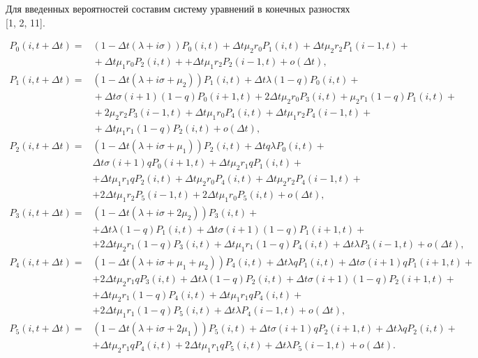 Для введенных вероятностей составим систему уравнений в конечных разностях [1, 2, 11]. 
\begin{adjustwidth}{0pt}{0pt}
	\begin{align*} 
		P_{0}(i,t+\Delta t)=&(1-\Delta t(\lambda+i\sigma))P_{0}(i,t)+\Delta t\mu_{2}r_{0}P_{1}(i,t)+\Delta t\mu_{2}r_{2}P_{1}(i-1,t)+\\
		&{}+\Delta t\mu_{1}r_{0}P_{2}(i,t)+
		+\Delta t\mu_{1}r_{2}P_{2}(i-1,t)+o(\Delta t),\\
		P_{1}(i,t+\Delta t)=&(1-\Delta t(\lambda+i\sigma+\mu_{2}))P_{1}(i,t)+\Delta t\lambda(1-q)P_{0}(i,t)+\\
		&{}+\Delta t\sigma(i+1)(1-q)P_{0}(i+1,t)+2\Delta t\mu_{2}r_{0}P_{3}(i,t) + \mu_{2}r_{1}(1-q)P_{1}(i,t)+\\
		&{}+2\mu_{2}r_{2}P_{3}(i-1,t)+\Delta t\mu_{1}r_{0}P_{4}(i,t)+
		\Delta t\mu_{1}r_{2}P_{4}(i-1,t)+\\
		&{}+\Delta t\mu_{1}r_{1}(1-q)P_{2}(i,t)+o(\Delta t),\\
		P_{2}(i,t+\Delta t)=&(1-\Delta t(\lambda+i\sigma+\mu_{1}))P_{2}(i,t)+\Delta tq\lambda P_{0}(i,t)+\\
		&\Delta t\sigma(i+1)qP_{0}(i+1,t)+\Delta t\mu_{2}r_{1}qP_{1}(i,t)+\\
		&+\Delta t\mu_{1}r_{1}qP_{2}(i,t)+\Delta t\mu_{2}r_{0}P_{4}(i,t)+\Delta t\mu_{2}r_{2}P_{4}(i-1,t)+\\
		&+2\Delta t\mu_{1}r_{2}P_{5}(i-1,t)+2\Delta t\mu_{1}r_{0}P_{5}(i,t)+o(\Delta t),\\
		P_{3}(i,t+\Delta t)=&(1-\Delta t(\lambda+i\sigma+2\mu_{2}))P_{3}(i,t)+\\
		&+\Delta t\lambda(1-q)P_{1}(i,t)+\Delta t\sigma(i+1)(1-q)P_{1}(i+1,t)+\\
		&+2\Delta t\mu_{2}r_{1}(1-q)P_{3}(i,t)+\Delta t\mu_{1}r_{1}(1-q)P_{4}(i,t)+\Delta t\lambda P_{3}(i-1,t)+o(\Delta t),\\
		P_{4}(i,t+\Delta t)=&(1-\Delta t(\lambda+i\sigma+\mu_{1}+\mu_{2}))P_{4}(i,t)+\Delta t\lambda qP_{1}(i,t)+\Delta t\sigma(i+1)qP_{1}(i+1,t)+\\
		&+2\Delta t\mu_{2}r_{1}qP_{3}(i,t)+\Delta t\lambda(1-q)P_{2}(i,t)+\Delta t\sigma(i+1)(1-q)P_{2}(i+1,t)+\\
		&+\Delta t\mu_{2}r_{1}(1-q)P_{4}(i,t)+\Delta t\mu_{1}r_{1}qP_{4}(i,t)+\\
		&+2\Delta t\mu_{1}r_{1}(1-q)P_{5}(i,t)+\Delta t\lambda P_{4}(i-1,t)+o(\Delta t),\\
		P_{5}(i,t+\Delta t)=&(1-\Delta t(\lambda+i\sigma+2\mu_{1}))P_{5}(i,t)+\Delta t\sigma(i+1)qP_{2}(i+1,t)+\Delta t\lambda qP_{2}(i,t)+\\
		&+\Delta t\mu_{2}r_{1}qP_{4}(i,t)+2\Delta t\mu_{1}r_{1}qP_{5}(i,t)+\Delta t\lambda P_{5}(i-1,t)+o(\Delta t).
	\end{align*}
\end{adjustwidth}
